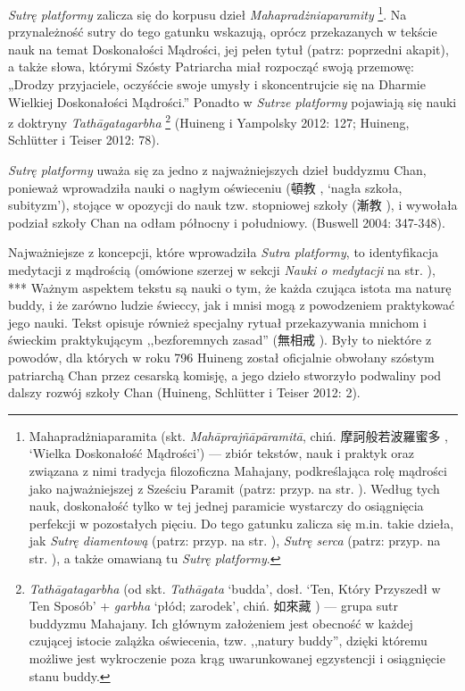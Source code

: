 \textit{Sutrę platformy} zalicza się do korpusu dzieł \textit{Mahapradżniaparamity}%
\footnote{Mahapradżniaparamita (skt. \textit{Mahāprajñāpāramitā}, chiń. 摩訶般若波羅蜜多 , `Wielka Doskonałość Mądrości') --- zbiór tekstów, nauk i praktyk oraz związana z nimi tradycja filozoficzna Mahajany, podkreślająca rolę mądrości jako najważniejszej z Sześciu Paramit (patrz: przyp. na str. \pageref{Paramitas}).
Według tych nauk, doskonałość tylko w tej jednej paramicie wystarczy do osiągnięcia perfekcji w pozostałych pięciu. Do tego gatunku zalicza się m.in. takie dzieła, jak \textit{Sutrę diamentową} (patrz: przyp. na str. \pageref{DiamondSutra}), \textit{Sutrę serca} (patrz: przyp. na str. \pageref{HeartSutra}), a także omawianą tu \textit{Sutrę platformy}.}.
Na przynależność sutry do tego gatunku wskazują, oprócz przekazanych w tekście nauk na temat Doskonałości Mądrości, jej pełen tytuł (patrz: poprzedni akapit), a także słowa, którymi Szósty Patriarcha miał rozpocząć swoją przemowę: „Drodzy przyjaciele, oczyśćcie swoje umysły i skoncentrujcie się na Dharmie Wielkiej Doskonałości Mądrości.”
Ponadto w \textit{Sutrze platformy} pojawiają się nauki z doktryny \textit{Tathāgatagarbha}%
\footnote{\textit{Tathāgatagarbha} (od skt. \textit{Tathāgata} `budda', dosł. `Ten, Który Przyszedł w Ten Sposób' + \textit{garbha} `płód; zarodek', chiń. 如來藏 ) --- grupa sutr buddyzmu Mahajany. Ich głównym założeniem jest obecność w każdej czującej istocie zalążka oświecenia, tzw. ,,natury buddy'', dzięki któremu możliwe jest wykroczenie poza krąg uwarunkowanej egzystencji i osiągnięcie stanu buddy.} %
(Huineng i Yampolsky 2012: 127; Huineng, Schlütter i Teiser 2012: 78).

\textit{Sutrę platformy} uważa się za jedno z najważniejszych dzieł buddyzmu Chan, ponieważ wprowadziła nauki o nagłym oświeceniu (頓教 , `nagła szkoła, subityzm'), stojące w opozycji do nauk tzw. stopniowej szkoły (漸教 ), i wywołała podział szkoły Chan na odłam północny i południowy. %
(Buswell 2004: 347-348).%

Najważniejsze z koncepcji, które wprowadziła \textit{Sutra platformy}, to identyfikacja medytacji z mądrością (omówione szerzej w sekcji \textit{Nauki o medytacji} na str. \pageref{DingHui}), ***
Ważnym aspektem tekstu są nauki o tym, że każda czująca istota ma naturę buddy, i że zarówno ludzie świeccy, jak i mnisi mogą z powodzeniem praktykować jego nauki.
Tekst opisuje również specjalny rytuał przekazywania mnichom i świeckim praktykującym ,,bezforemnych zasad'' (無相戒 ). %
Były to niektóre z powodów, dla których w roku 796 Huineng został oficjalnie obwołany szóstym patriarchą Chan przez cesarską komisję, a jego dzieło stworzyło podwaliny pod dalszy rozwój szkoły Chan
(Huineng, Schlütter i Teiser 2012: 2).

